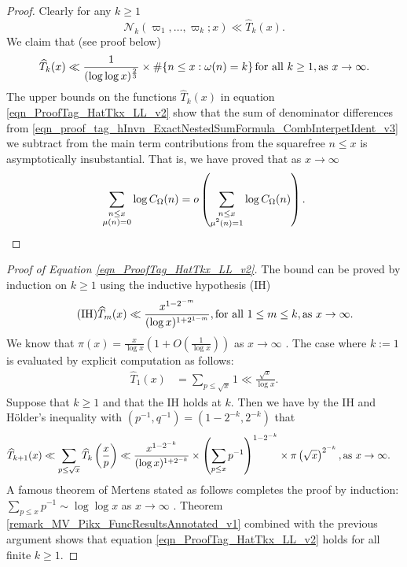 \documentclass[11pt,reqno,a4letter]{article}
\newcommand{\hlocalref}[1]{\hyperref[#1]{\ref{#1}}}
\numberwithin{equation}{section}
\numberwithin{figure}{section}
\numberwithin{table}{section}
\theoremstyle{plain}
\numberwithin{theorem}{section}
\theoremstyle{definition}
\theoremstyle{remark}
\newcommand{\mathtext}[1]{\text{\rm #1}}
\begin{document}
\begin{proof}
Clearly for any $k \geq 1$ 
\[
\mathcal{N}_k(\varpi_1, \ldots, \varpi_k; x) \ll \widehat{T}_k(x). 
\]
We claim that (see proof below) 
\begin{equation}
\label{eqn_ProofTag_HatTkx_LL_v2}
\widehat{T}_k(x) \ll \frac{1}{(\log\log x)^{\frac{2}{3}}} \times 
     \#\{n \leq x: \omega(n)=k\}\, 
     \mathtext{ for all } k \geq 1, \mathtext{ as } x \rightarrow \infty. 
\end{equation}
The upper bounds on the functions $\widehat{T}_k(x)$ in 
equation \eqref{eqn_ProofTag_HatTkx_LL_v2} 
show that the sum of denominator differences from 
\eqref{eqn_proof_tag_hInvn_ExactNestedSumFormula_CombInterpetIdent_v3} we subtract from the 
main term contributions from the squarefree $n \leq x$ is asymptotically insubstantial. 
That is, we have proved that as $x \rightarrow \infty$ 
\[
\sum_{\substack{n \leq x \\ \mu(n)=0}} \log C_{\Omega}(n) = 
     o\left(\sum_{\substack{n \leq x \\ \mu^2(n)=1}} \log C_{\Omega}(n)\right). 
     \qedhere
\]
\end{proof}

\begin{proof}[Proof of Equation \eqref{eqn_ProofTag_HatTkx_LL_v2}]
The bound can be proved by induction on $k \geq 1$ using the inductive hypothesis (IH)
\[
\tag{IH}
\widehat{T}_m(x) \ll \frac{x^{1-2^{-m}}}{(\log x)^{1+2^{1-m}}}, 
	\mathtext{ for all } 1 \leq m \leq k, 
	\mathtext{ as } x \rightarrow \infty. 
\] 
We know that 
$\pi(x) = \frac{x}{\log x} \left(1 + O\left(\frac{1}{\log x}\right)\right)$ 
as $x \rightarrow \infty$ \cite[\S 22.4]{HARDYWRIGHT}. 
The case where $k := 1$ is evaluated by explicit computation as follows: 
\begin{align*}
\widehat{T}_1(x) & = \sum_{p \leq \sqrt{x}} 1 \ll \frac{\sqrt{x}}{\log x}. 
\end{align*}
Suppose that $k \geq 1$ and that the IH holds at $k$. 
Then we have by the IH and 
H\"older's inequality with $\left(p^{-1}, q^{-1}\right) = \left(1-2^{-k}, 2^{-k}\right)$ that 
\begin{align*}
\widehat{T}_{k+1}(x) & \ll \sum_{p \leq \sqrt{x}} \widehat{T}_{k}\left(\frac{x}{p}\right) 
	\ll \frac{x^{1-2^{-k}}}{(\log x)^{1+2^{-k}}} \times 
	\left(\sum_{p \leq x} p^{-1}\right)^{1-2^{-k}} \times 
	\pi\left(\sqrt{x}\right)^{2^{-k}}, 
	\mathtext{ as } x \rightarrow \infty. 
\end{align*}
A famous theorem of Mertens stated as follows completes the proof by induction: 
$\sum_{p \leq x} p^{-1} \sim \log\log x$ as $x \rightarrow \infty$ 
\cite[\S 22.7--22.8]{HARDYWRIGHT}. 
Theorem \hlocalref{remark_MV_Pikx_FuncResultsAnnotated_v1} 
combined with the previous argument shows that 
equation \eqref{eqn_ProofTag_HatTkx_LL_v2} holds for all finite $k \geq 1$.
\end{proof}
\end{document}
